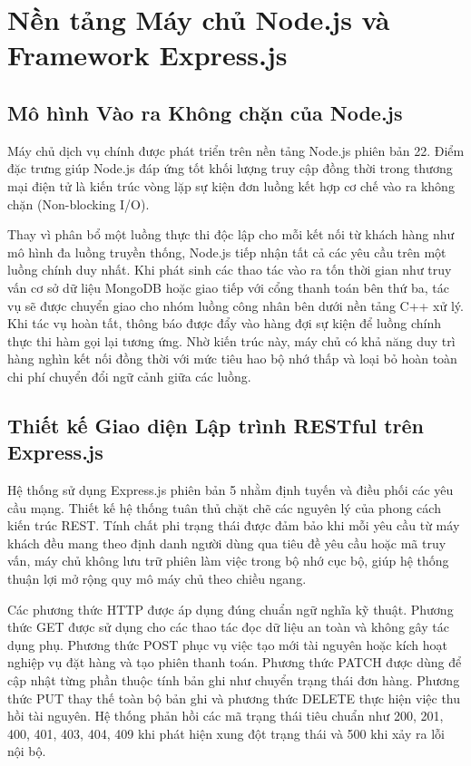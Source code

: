 \section{Nền tảng Máy chủ Node.js và Framework Express.js}
\subsection{Mô hình Vào ra Không chặn của Node.js}
Máy chủ dịch vụ chính được phát triển trên nền tảng Node.js phiên bản 22. Điểm đặc trưng giúp Node.js đáp ứng tốt khối lượng truy cập đồng thời trong thương mại điện tử là kiến trúc vòng lặp sự kiện đơn luồng kết hợp cơ chế vào ra không chặn (Non-blocking I/O).

Thay vì phân bổ một luồng thực thi độc lập cho mỗi kết nối từ khách hàng như mô hình đa luồng truyền thống, Node.js tiếp nhận tất cả các yêu cầu trên một luồng chính duy nhất. Khi phát sinh các thao tác vào ra tốn thời gian như truy vấn cơ sở dữ liệu MongoDB hoặc giao tiếp với cổng thanh toán bên thứ ba, tác vụ sẽ được chuyển giao cho nhóm luồng công nhân bên dưới nền tảng C++ xử lý. Khi tác vụ hoàn tất, thông báo được đẩy vào hàng đợi sự kiện để luồng chính thực thi hàm gọi lại tương ứng. Nhờ kiến trúc này, máy chủ có khả năng duy trì hàng nghìn kết nối đồng thời với mức tiêu hao bộ nhớ thấp và loại bỏ hoàn toàn chi phí chuyển đổi ngữ cảnh giữa các luồng.

\subsection{Thiết kế Giao diện Lập trình RESTful trên Express.js}
Hệ thống sử dụng Express.js phiên bản 5 nhằm định tuyến và điều phối các yêu cầu mạng. Thiết kế hệ thống tuân thủ chặt chẽ các nguyên lý của phong cách kiến trúc REST. Tính chất phi trạng thái được đảm bảo khi mỗi yêu cầu từ máy khách đều mang theo định danh người dùng qua tiêu đề yêu cầu hoặc mã truy vấn, máy chủ không lưu trữ phiên làm việc trong bộ nhớ cục bộ, giúp hệ thống thuận lợi mở rộng quy mô máy chủ theo chiều ngang.

Các phương thức HTTP được áp dụng đúng chuẩn ngữ nghĩa kỹ thuật. Phương thức GET được sử dụng cho các thao tác đọc dữ liệu an toàn và không gây tác dụng phụ. Phương thức POST phục vụ việc tạo mới tài nguyên hoặc kích hoạt nghiệp vụ đặt hàng và tạo phiên thanh toán. Phương thức PATCH được dùng để cập nhật từng phần thuộc tính bản ghi như chuyển trạng thái đơn hàng. Phương thức PUT thay thế toàn bộ bản ghi và phương thức DELETE thực hiện việc thu hồi tài nguyên. Hệ thống phản hồi các mã trạng thái tiêu chuẩn như 200, 201, 400, 401, 403, 404, 409 khi phát hiện xung đột trạng thái và 500 khi xảy ra lỗi nội bộ.


